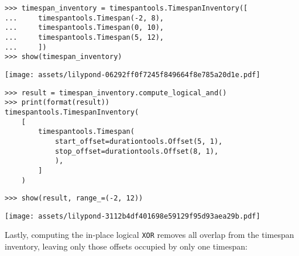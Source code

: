 \begin{singlespacing}
\vspace{-0.5\baselineskip}
\begin{lstlisting}
>>> timespan_inventory = timespantools.TimespanInventory([
...     timespantools.Timespan(-2, 8),
...     timespantools.Timespan(0, 10),
...     timespantools.Timespan(5, 12),
...     ])
>>> show(timespan_inventory)
\end{lstlisting}
\noindent\texttt{[image: assets/lilypond-06292ff0f7245f849664f8e785a20d1e.pdf]}
\begin{lstlisting}
>>> result = timespan_inventory.compute_logical_and()
>>> print(format(result))
timespantools.TimespanInventory(
    [
        timespantools.Timespan(
            start_offset=durationtools.Offset(5, 1),
            stop_offset=durationtools.Offset(8, 1),
            ),
        ]
    )
\end{lstlisting}
\begin{lstlisting}
>>> show(result, range_=(-2, 12))
\end{lstlisting}
\noindent\texttt{[image: assets/lilypond-3112b4df401698e59129f95d93aea29b.pdf]}
\end{singlespacing}

\noindent Lastly, computing the in-place logical \texttt{XOR} removes all
overlap from the timespan inventory, leaving only those offsets occupied by
only one timespan:

\begin{comment}
<abjad>
timespan_inventory = timespantools.TimespanInventory([
    timespantools.Timespan(-2, 2),
    timespantools.Timespan(0, 10),
    timespantools.Timespan(5, 12),
    ])
show(timespan_inventory)
result = timespan_inventory.compute_logical_xor()
print(format(result))
show(result, range_=(-2, 12))
</abjad>
\end{comment}

